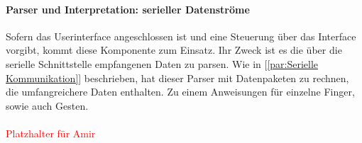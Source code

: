 \documentclass[titlepage,12pt,twoside]{article}
\begin{document}
\paragraph{Parser und Interpretation: serieller Datenströme}
\label{par:Parser und Interpretation: serieller Datenströme}
\hfill \break
\hfill \break
Sofern das Userinterface angeschlossen ist und eine Steuerung über das Interface vorgibt, kommt diese Komponente zum Einsatz. Ihr Zweck ist es die über 
die serielle Schnittstelle empfangenen Daten zu parsen.  Wie in [\textcolor{blue}{\autoref{par:Serielle Kommunikation}}] beschrieben, hat dieser Parser mit 
Datenpaketen zu rechnen, die umfangreichere Daten enthalten. Zu einem Anweisungen für einzelne Finger, sowie auch Gesten. \\
\\
\textcolor{red}{Platzhalter für Amir} \\
\\
\end{document}
